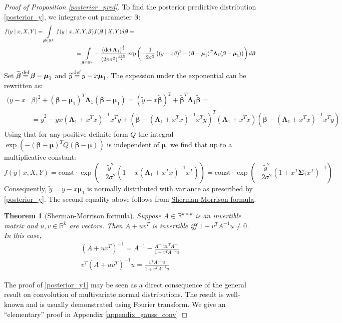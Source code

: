 \documentclass[10pt,fleqn]{amsart}
\newtheorem{theorem}{Theorem}[section]
\theoremstyle{definition}
\theoremstyle{remark}
\numberwithin{equation}{section}
\newcommand{\RR}{\mathbb{R}}
\newcommand{\eq}{\stackrel{\mathclap{\normalfont\text{def}}}{=}}
\newcommand{\const}{\text{const}}
\newcommand{\bbeta}{\boldsymbol{\beta}}
\newcommand{\mmu}{\boldsymbol{\mu}}
\newcommand{\SSigma}{\boldsymbol{\Sigma}}
\newcommand{\LLambda}{\boldsymbol{\Lambda}}
\newcommand{\bbetatilde}{\widetilde{\bbeta}}
\newcommand{\ytilde}{\widetilde{y}}
\begin{document}
\begin{proof}[Proof of Proposition \ref{posterior_pred}]
\noindent To find the posterior predictive distribution \ref{posterior_y}, we integrate out parameter $\bbeta$:
\begin{equation*}\begin{split}
f(y\mid x, X, Y)=\int\displaylimits_{\bbeta\in\RR^k}f(y\mid x,X,Y,\bbeta)&f(\bbeta\mid X,Y)d\bbeta=\\
=\int\displaylimits_{\bbeta\in\RR^k}&-\frac {\left(\det\LLambda_1\right)^{\frac 12}}{\left(2\pi\sigma^2\right)^{\frac{1+k}2}}
\exp\left(-\frac 1{2\sigma^2}\left((y-x\beta)^2+(\bbeta-\mmu_1)^T\LLambda_1(\bbeta-\mmu_1)\right)\right)d\bbeta
\end{split}\end{equation*}
Set $\bbetatilde\eq\bbeta-\mmu_1$ and $\ytilde\eq y-x\mmu_1$. The expession under the exponential can be rewritten as:
\begin{equation*}\begin{split}
    (y-x&\beta)^2+(\bbeta-\mmu_1)^T\LLambda_1(\bbeta-\mmu_1)=
    \left(\ytilde-x\bbetatilde\right)^2+\bbetatilde^T\LLambda_1\bbetatilde=\\
    &=\ytilde^2-\ytilde x\left(\LLambda_1+x^Tx\right)^{-1}x^T\ytilde+
    \left(\bbetatilde-\left(\LLambda_1+x^Tx\right)^{-1}x^T\ytilde\right)^T\left(\LLambda_1+x^Tx\right)
    \left(\bbetatilde-\left(\LLambda_1+x^Tx\right)^{-1}x^T\ytilde\right)
\end{split}\end{equation*}
Using that for any positive definite form $Q$ the integral $\exp(-(\bbeta-\mmu)^TQ(\bbeta - \mmu))$ is independent of $\mmu$,
we find that up to a multiplicative constant:
\begin{equation*}
    f(y\mid x, X, Y)=\const\cdot \exp\left(-\frac {\ytilde^2}{2\sigma^2}\left(1-x\left(\LLambda_1+x^Tx\right)^{-1}x^T\right)\right)=
    \const\cdot \exp\left(-\frac {\ytilde^2}{2\sigma^2}\left(1+x^T\SSigma_1 x^T\right)^{-1}\right)
\end{equation*}
Consequently, $\ytilde=y-x\mmu_1$ is normally distributed with variance as prescribed by \ref{posterior_y}.
The second equality above follows from \href{https://en.wikipedia.org/wiki/Sherman%E2%80%93Morrison_formula}{Sherman-Morrison formula}.
\begin{theorem}[Sherman-Morrison formula]
    Suppose $A\in\RR^{k\times k}$ is an invertible matrix and $u,v\in \RR^k$ are vectors. Then $A+uv^T$  is invertible iff $1+v^TA^{-1}u\neq 0$.
    In this case,
    \begin{align}
        \left(A+uv^T\right)^{-1}=A^{-1}-\frac{A^{-1}uv^TA^{-1}}{1+v^TA^{-1}u}\\
        v^T\left(A+uv^T\right)^{-1}u=\frac{v^TA^{-1}u}{1+v^TA^{-1}u}
    \end{align}
\end{theorem}
The proof of \ref{posterior_y1} may be seen as a direct consequence of the general result on convolution of multivariate normal distributions.
The result is well-known and is usually demonstrated using Fourier transform.
We give an ``elementary'' proof in Appendix \ref{appendix_gauss_conv}
\end{proof}
\end{document}
